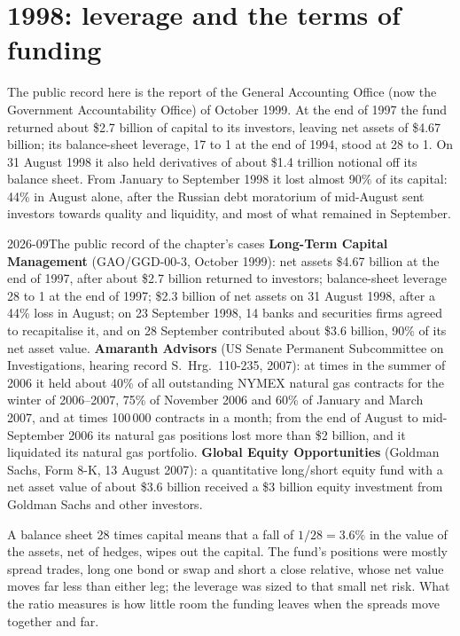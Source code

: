 \section{1998: leverage and the terms of funding}

The public record here is the report of the General Accounting Office (now the Government Accountability Office) of October 1999. At the end of 1997 the fund
returned about \$2.7 billion of capital to its investors, leaving net assets of \$4.67 billion; its balance-sheet leverage, 17 to 1 at the end of 1994,
stood at 28 to 1. On 31 August 1998 it also held derivatives of about \$1.4 trillion notional off its balance sheet. From January to September 1998 it
lost almost 90\% of its capital: 44\% in August alone, after the Russian debt moratorium of mid-August sent investors towards quality and liquidity, and most of what remained in September.

\begin{dated}{2026-09}{The public record of the chapter's cases}\label{dat:fm:case-studies-i:record}
\textbf{Long-Term Capital Management} (GAO/GGD-00-3, October 1999): net assets \$4.67 billion at the end of 1997, after about \$2.7 billion returned
to investors; balance-sheet leverage 28 to 1 at the end of 1997; \$2.3 billion of net assets on 31 August 1998, after a 44\% loss in August; on 23
September 1998, 14 banks and securities firms agreed to recapitalise it, and on 28 September contributed about \$3.6 billion, 90\% of its net asset
value. \textbf{Amaranth Advisors} (US Senate Permanent Subcommittee on Investigations, hearing record S.~Hrg.~110-235, 2007): at times in the summer of
2006 it held about 40\% of all outstanding NYMEX natural gas contracts for the winter of 2006--2007, 75\% of November 2006 and 60\% of January and
March 2007, and at times 100\,000 contracts in a month; from the end of August to mid-September 2006 its natural gas positions lost more than \$2
billion, and it liquidated its natural gas portfolio. \textbf{Global Equity Opportunities} (Goldman Sachs, Form 8-K, 13 August 2007): a quantitative
long/short equity fund with a net asset value of about \$3.6 billion received a \$3 billion equity investment from Goldman Sachs and other investors.
\end{dated}

A balance sheet 28 times capital means that a fall of $1/28=3.6\%$ in the value of the assets, net of hedges, wipes out the capital. The fund's
positions were mostly spread trades, long one bond or swap and short a close relative, whose net value moves far less than either leg; the leverage
was sized to that small net risk. What the ratio measures is how little room the funding leaves when the spreads move together and far.

